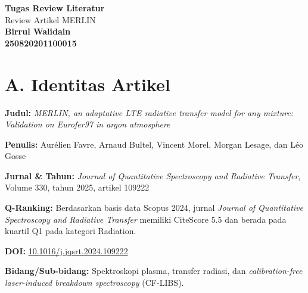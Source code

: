 \documentclass[12pt,a4paper]{article}
\newcommand{\templateitem}[2]{\textbf{#1} #2\par}
\begin{document}
\begin{center}
  {\Large \textbf{Tugas Review Literatur}}\\[4pt]
  {\large Review Artikel MERLIN}\\[8pt]
  \textbf{Birrul Walidain}\\
  \textbf{250820201100015}\\[6pt]
\end{center}

\section*{A. Identitas Artikel}
\templateitem{Judul:}{\textit{MERLIN, an adaptative LTE radiative transfer model for any mixture: Validation on Eurofer97 in argon atmosphere}}
\templateitem{Penulis:}{Aur\'elien Favre, Arnaud Bultel, Vincent Morel, Morgan Lesage, dan L\'eo Gosse}
\templateitem{Jurnal \& Tahun:}{\textit{Journal of Quantitative Spectroscopy and Radiative Transfer}, Volume 330, tahun 2025, artikel 109222}
\templateitem{Q-Ranking:}{Berdasarkan basis data Scopus 2024, jurnal \textit{Journal of Quantitative Spectroscopy and Radiative Transfer} memiliki CiteScore 5.5 dan berada pada kuartil Q1 pada kategori Radiation.}
\templateitem{DOI:}{\href{https://doi.org/10.1016/j.jqsrt.2024.109222}{10.1016/j.jqsrt.2024.109222}}
\templateitem{Bidang/Sub-bidang:}{Spektroskopi plasma, transfer radiasi, dan \textit{calibration-free laser-induced breakdown spectroscopy} (CF-LIBS).}
\end{document}

